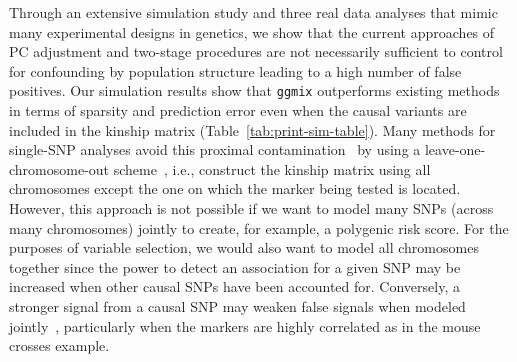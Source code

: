 \documentclass[12pt,letter]{article}\usepackage[]{graphicx}\usepackage[]{color}
\begin{document}
Through an extensive simulation study and three real data analyses that mimic many experimental designs in genetics, we show that the current approaches of PC adjustment and two-stage procedures are not necessarily sufficient to control for confounding by population structure leading to a high number of false positives. Our simulation results show that \texttt{ggmix} outperforms existing methods in terms of sparsity and prediction error even when the causal variants are included in the kinship matrix (Table~\ref{tab:print-sim-table}). Many methods for single-SNP analyses avoid this proximal contamination~\citep{lippert2011fast} by using a leave-one-chromosome-out scheme~\citep{loh2015efficient}, i.e., construct the kinship matrix using all chromosomes except the one on which the marker being tested is located. However, this approach is not possible if we want to model many SNPs (across many chromosomes) jointly to create, for example, a polygenic risk score. For the purposes of variable selection, we would also want to model all chromosomes together since the power to detect an association for a given SNP may be increased when other causal SNPs have been accounted for. Conversely, a stronger signal from a causal SNP may weaken false signals when modeled jointly~\citep{hoggart2008simultaneous}, particularly when the markers are highly correlated as in the mouse crosses example.
\end{document}

